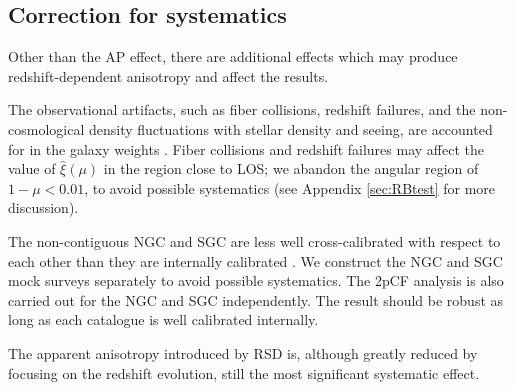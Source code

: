 \documentclass[iop]{emulateapj}
\begin{document}
\subsection{Correction for systematics}\label{sec:syscor}

Other than the AP effect, there are additional effects 
which may produce redshift-dependent anisotropy and affect the results. 

The observational artifacts, such as fiber collisions, redshift failures, 
and the non-cosmological density fluctuations with stellar density and seeing,
are accounted for in the galaxy weights \citep{Reidetal:2016}.
Fiber collisions and redshift failures may affect the value of $\hat\xi(\mu)$ in the region close to LOS;
we abandon the angular region of $1-\mu<0.01$, 
to avoid possible systematics (see Appendix \ref{sec:RBtest} for more discussion). 

The non-contiguous NGC and SGC are less well cross-calibrated with respect to each other 
than they are internally calibrated \citep{Schlafly2010,SF2011,Parejko2013}.
We construct the NGC and SGC mock surveys separately to avoid possible systematics.
The 2pCF analysis is also carried out for the NGC and SGC independently.
The result should be robust as long as each catalogue is well calibrated internally.




The apparent anisotropy introduced by RSD is, 
although greatly reduced by focusing on the redshift evolution, 
still the most significant systematic effect.
\end{document}
